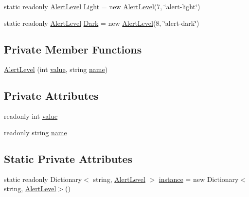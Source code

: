 \begin{DoxyCompactItemize}
\item 
static readonly \mbox{\hyperlink{classWebApplication_1_1Framework_1_1AlertLevel}{Alert\+Level}} \mbox{\hyperlink{classWebApplication_1_1Framework_1_1AlertLevel_a70b5e8d90d75b06169650f80e41530f2}{Light}} = new \mbox{\hyperlink{classWebApplication_1_1Framework_1_1AlertLevel}{Alert\+Level}}(7, \char`\"{}alert-\/light\char`\"{})
\item 
static readonly \mbox{\hyperlink{classWebApplication_1_1Framework_1_1AlertLevel}{Alert\+Level}} \mbox{\hyperlink{classWebApplication_1_1Framework_1_1AlertLevel_a3f7963f2f1c7c164dd8eca9282c4a45c}{Dark}} = new \mbox{\hyperlink{classWebApplication_1_1Framework_1_1AlertLevel}{Alert\+Level}}(8, \char`\"{}alert-\/dark\char`\"{})
\end{DoxyCompactItemize}
\subsection*{Private Member Functions}
\begin{DoxyCompactItemize}
\item 
\mbox{\hyperlink{classWebApplication_1_1Framework_1_1AlertLevel_a6ae8ebba99dceeffaef7ec12e36d4cfa}{Alert\+Level}} (int \mbox{\hyperlink{classWebApplication_1_1Framework_1_1AlertLevel_aa8e313cfae63b3fd070b26b8e4c8f723}{value}}, string \mbox{\hyperlink{classWebApplication_1_1Framework_1_1AlertLevel_ad61a3ca4bbd6bf6e4c75f440cd7b05a1}{name}})
\end{DoxyCompactItemize}
\subsection*{Private Attributes}
\begin{DoxyCompactItemize}
\item 
readonly int \mbox{\hyperlink{classWebApplication_1_1Framework_1_1AlertLevel_aa8e313cfae63b3fd070b26b8e4c8f723}{value}}
\item 
readonly string \mbox{\hyperlink{classWebApplication_1_1Framework_1_1AlertLevel_ad61a3ca4bbd6bf6e4c75f440cd7b05a1}{name}}
\end{DoxyCompactItemize}
\subsection*{Static Private Attributes}
\begin{DoxyCompactItemize}
\item 
static readonly Dictionary$<$ string, \mbox{\hyperlink{classWebApplication_1_1Framework_1_1AlertLevel}{Alert\+Level}} $>$ \mbox{\hyperlink{classWebApplication_1_1Framework_1_1AlertLevel_a8370df6086f44039b93fbc1ae8da2d01}{instance}} = new Dictionary$<$string, \mbox{\hyperlink{classWebApplication_1_1Framework_1_1AlertLevel}{Alert\+Level}}$>$()
\end{DoxyCompactItemize}


